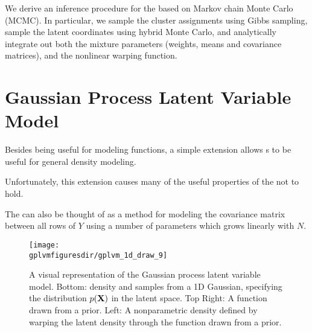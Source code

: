 We derive an inference procedure for the \iwmm{} based on Markov chain Monte Carlo (MCMC).  In particular, we sample the cluster assignments using Gibbs sampling, sample the latent coordinates using hybrid Monte Carlo, and analytically integrate out both the mixture parameters (weights, means and covariance matrices), and the nonlinear warping function. 






\section{Gaussian Process Latent Variable Model}


Besides being useful for modeling functions, a simple extension allows \gp{}s to be useful for general density modeling.  



Unfortunately, this extension causes many of the useful properties of the \gp{} not to hold.

The \gplvm{} can also be thought of as a method for modeling the covariance matrix between all rows of $Y$ using a number of parameters which grows linearly with $N$.


\begin{figure}[t]
\begin{centering}
\texttt{[image: \\gplvmfiguresdir/gplvm\_1d\_draw\_9]}
\end{centering}
\caption[One-dimensional Gaussian process latent variable model]{A visual representation of the Gaussian process latent variable model.  Bottom: density and samples from a 1D Gaussian, specifying the distribution $p(\mathbf{X})$ in the latent space.  Top Right: A function drawn from a \gp{} prior.  Left: A nonparametric density defined by warping the latent density through the function drawn from a \gp{} prior.}  
\label{fig:oned-gplvm}
\end{figure}



